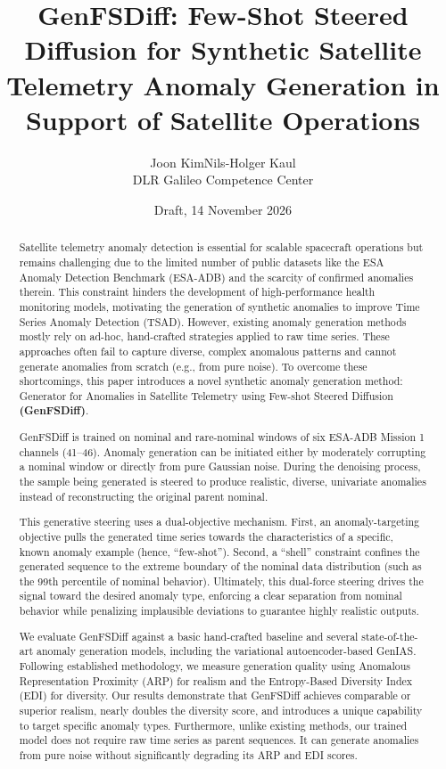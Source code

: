 \documentclass[11pt,a4paper]{article}
\title{GenFSDiff: Few-Shot Steered Diffusion for Synthetic Satellite Telemetry Anomaly Generation in Support of Satellite Operations}
\author{Joon Kim\qquad Nils-Holger Kaul\\[0.4em]
\large DLR Galileo Competence Center}
\date{Draft, 14 November 2026}
\newif\ifsubmittedabstract \submittedabstracttrue
\begin{document}
\maketitle

\begin{abstract}
\noindent
\ifsubmittedabstract
Satellite telemetry anomaly detection is essential for scalable spacecraft operations but remains challenging due to the limited number of public datasets like the ESA Anomaly Detection Benchmark (ESA-ADB) and the scarcity of confirmed anomalies therein. This constraint hinders the development of high-performance health monitoring models, motivating the generation of synthetic anomalies to improve Time Series Anomaly Detection (TSAD). However, existing anomaly generation methods mostly rely on ad-hoc, hand-crafted strategies applied to raw time series. These approaches often fail to capture diverse, complex anomalous patterns and cannot generate anomalies from scratch (e.g., from pure noise). To overcome these shortcomings, this paper introduces a novel synthetic anomaly generation method: Generator for Anomalies in Satellite Telemetry using Few-shot Steered Diffusion \textbf{(GenFSDiff)}.

GenFSDiff is trained on nominal and rare-nominal windows of six ESA-ADB Mission 1 channels (41--46). Anomaly generation can be initiated either by moderately corrupting a nominal window or directly from pure Gaussian noise. During the denoising process, the sample being generated is steered to produce realistic, diverse, univariate anomalies instead of reconstructing the original parent nominal.

This generative steering uses a dual-objective mechanism. First, an anomaly-targeting objective pulls the generated time series towards the characteristics of a specific, known anomaly example (hence, ``few-shot''). Second, a ``shell'' constraint confines the generated sequence to the extreme boundary of the nominal data distribution (such as the 99th percentile of nominal behavior). Ultimately, this dual-force steering drives the signal toward the desired anomaly type, enforcing a clear separation from nominal behavior while penalizing implausible deviations to guarantee highly realistic outputs.

We evaluate GenFSDiff against a basic hand-crafted baseline and several state-of-the-art anomaly generation models, including the variational autoencoder-based GenIAS. Following established methodology, we measure generation quality using Anomalous Representation Proximity (ARP) for realism and the Entropy-Based Diversity Index (EDI) for diversity. Our results demonstrate that GenFSDiff achieves comparable or superior realism, nearly doubles the diversity score, and introduces a unique capability to target specific anomaly types. Furthermore, unlike existing methods, our trained model does not require raw time series as parent sequences. It can generate anomalies from pure noise without significantly degrading its ARP and EDI scores.


\end{abstract}
\end{document}
